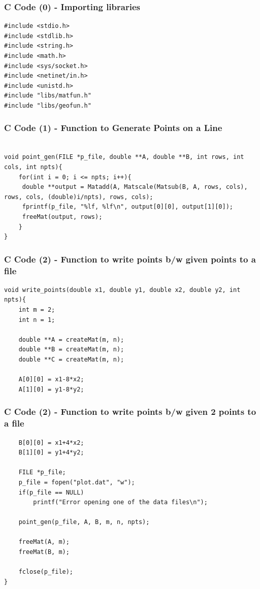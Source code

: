 \documentclass{beamer}
\begin{document}
\begin{frame}[fragile]
    \frametitle{C Code (0) - Importing libraries}

    \begin{lstlisting}
#include <stdio.h>
#include <stdlib.h>
#include <string.h>
#include <math.h>
#include <sys/socket.h>
#include <netinet/in.h>
#include <unistd.h>
#include "libs/matfun.h"
#include "libs/geofun.h"
    \end{lstlisting}
\end{frame}
\begin{frame}[fragile]
    \frametitle{C Code (1) - Function to Generate Points on a Line}

    \begin{lstlisting}

void point_gen(FILE *p_file, double **A, double **B, int rows, int cols, int npts){
    for(int i = 0; i <= npts; i++){
     double **output = Matadd(A, Matscale(Matsub(B, A, rows, cols), rows, cols, (double)i/npts), rows, cols);
     fprintf(p_file, "%lf, %lf\n", output[0][0], output[1][0]);
     freeMat(output, rows);
    }
}

    \end{lstlisting}
\end{frame}


\begin{frame}[fragile]
    \frametitle{C Code (2) - Function to write points b/w given points to a file}

    \begin{lstlisting}
void write_points(double x1, double y1, double x2, double y2, int npts){
    int m = 2;
    int n = 1;

    double **A = createMat(m, n);
    double **B = createMat(m, n);
    double **C = createMat(m, n);

    A[0][0] = x1-8*x2;
    A[1][0] = y1-8*y2;
    \end{lstlisting}
\end{frame}
\begin{frame}[fragile]
    \frametitle{C Code (2) - Function to write points b/w given 2 points to a file}

    \begin{lstlisting}
    B[0][0] = x1+4*x2;
    B[1][0] = y1+4*y2;

    FILE *p_file;
    p_file = fopen("plot.dat", "w");
    if(p_file == NULL)
        printf("Error opening one of the data files\n");

    point_gen(p_file, A, B, m, n, npts);

    freeMat(A, m);
    freeMat(B, m);

    fclose(p_file);
}
    \end{lstlisting}
\end{frame}
\end{document}
